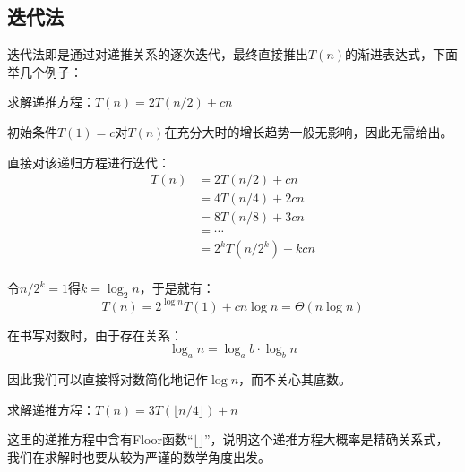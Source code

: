 \documentclass[12pt,a4paper,violet]{bbe}
\begin{document}
\subsection{迭代法\label{2.4.1}}
迭代法即是通过对递推关系的逐次迭代，最终直接推出$T(n)$的渐进表达式，下面举几个例子：
\begin{example}
	求解递推方程：$T(n)=2T(n/2)+cn$
\end{example}
\begin{remark}
	初始条件$T(1)=c$对$T(n)$在充分大时的增长趋势一般无影响，因此无需给出。
\end{remark}
\begin{solution}
	直接对该递归方程进行迭代：
	$$
	\begin{array}{rl}
		T(n)&=2T(n/2)+cn\\
		&=4T(n/4)+2cn\\
		&=8T(n/8)+3cn\\
		&=\cdots\\
		&=2^kT(n/2^k)+kcn\\
	\end{array}
	$$
	
	令$n/2^k=1$得$k=\log_2 n$，于是就有：
	$$
	T(n)=2^{\log n}T(1)+cn\log n=\Theta(n\log n)
	$$
\end{solution}
\begin{remark}
	在书写对数时，由于存在关系：
	$$
	\log_a n=\log_a b\cdot\log_b n
	$$
	
	因此我们可以直接将对数简化地记作$\log n$，而不关心其底数。
\end{remark}
\begin{example}
	求解递推方程：$T(n)=3T(\lfloor n/4\rfloor)+n$
\end{example}
\begin{remark}
	这里的递推方程中含有Floor函数“$\lfloor\rfloor$”，说明这个递推方程大概率是精确关系式，我们在求解时也要从较为严谨的数学角度出发。
\end{remark}
\end{document}
